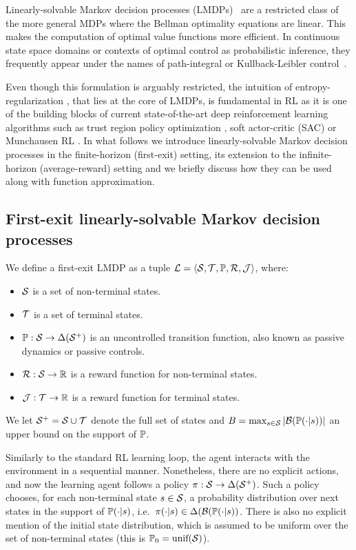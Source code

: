 Linearly-solvable Markov decision processes (LMDPs)~\citep{Todorov2006, Kappen2005} are a restricted class of the more general MDPs where the Bellman optimality equations are linear. This makes the computation of optimal value functions more efficient. In continuous state space domains or contexts of optimal control as probabilistic inference, they frequently appear under the names of path-integral or Kullback-Leibler control~\citep{Kappen2012}. 

Even though this formulation is arguably restricted, the intuition of entropy-regularization \citep{Neu2017}, that lies at the core of LMDPs, is fundamental in RL as it is one of the building blocks of current state-of-the-art deep reinforcement learning algorithms such as trust region policy optimization \citep{Schulman2015}, soft actor-critic (SAC) \citep{Haarnoja2018} or Munchausen RL \citep{Vieillard2020}. In what follows we introduce linearly-solvable Markov decision processes in the finite-horizon (first-exit) setting, its extension to the infinite-horizon (average-reward) setting and we briefly discuss how they can be used along with function approximation.

\subsection{First-exit linearly-solvable Markov decision processes}

We define a first-exit LMDP as a tuple $\mathcal{L}=\langle\mathcal{S},\mathcal{T},\mathbb{P},\mathcal{R},\mathcal{J}\rangle$, where: \begin{itemize}
  \item $\mathcal{S}$ is a set of non-terminal states.
  \item $\mathcal{T}$ is a set of terminal states.
  \item $\mathbb{P}:\mathcal{S}\rightarrow\Delta(\mathcal{S}^+)$ is an uncontrolled transition function, also known as passive dynamics or passive controls.
  \item $\mathcal{R}:\mathcal{S}\rightarrow\mathbb{R}$ is a reward function for non-terminal states.
  \item $\mathcal{J}:\mathcal{T}\rightarrow\mathbb{R}$ is a reward function for terminal states.
\end{itemize}

\noindent We let $\mathcal{S}^+=\mathcal{S}\cup\mathcal{T}$ denote the full set of states and $B=\max_{s\in\mathcal{S}}|\mathcal{B}(\mathbb{P}(\cdot|s))|$ an upper bound on the support of $\mathbb{P}$. 

Similarly to the standard RL learning loop, the agent interacts with the environment in a sequential manner. Nonetheless, there are no explicit actions, and now the learning agent follows a policy $\pi:\mathcal{S}\rightarrow\Delta(\mathcal{S}^+)$. Such a policy chooses, for each non-terminal state $s\in\mathcal{S}$, a probability distribution over next states in the support of $\mathbb{P}(\cdot|s)$, i.e.~$\pi(\cdot|s)\in\Delta(\mathcal{B}(\mathbb{P}(\cdot|s))$. There is also no explicit mention of the initial state distribution, which is assumed to be uniform over the set of non-terminal states (this is $\mathbb{P}_0 = \text{unif}(\mathcal{S})$). 

